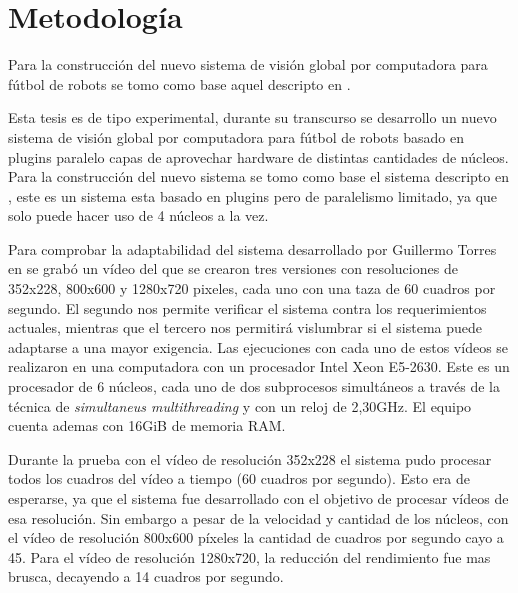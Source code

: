 
\section{Metodología}

Para la construcción del nuevo sistema de visión global por computadora para
fútbol de robots se tomo como base aquel descripto en \cite{torres2014}.

Esta tesis es de tipo experimental, durante su transcurso se desarrollo un
nuevo sistema de visión global por computadora para fútbol de robots basado en
plugins paralelo capas de aprovechar hardware de distintas cantidades de
núcleos. Para la construcción del nuevo sistema se tomo como base el sistema
descripto en \cite{torres2014}, este es un sistema esta basado en plugins pero
de paralelismo limitado, ya que solo puede hacer uso de 4 núcleos a la vez.

Para comprobar la adaptabilidad del sistema desarrollado por Guillermo Torres en
\cite{torres2014} se grabó un vídeo del que se crearon tres versiones con
resoluciones de 352x228, 800x600 y 1280x720 pixeles, cada uno con una taza de 60
cuadros por segundo. El segundo nos permite verificar el sistema contra los
requerimientos actuales, mientras que el tercero nos permitirá vislumbrar si el
sistema puede adaptarse a una mayor exigencia. Las ejecuciones con cada uno de
estos vídeos se realizaron en una computadora con un procesador Intel Xeon
E5-2630. Este es un procesador de 6 núcleos, cada uno de dos subprocesos
simultáneos a través de la técnica de \emph{simultaneus multithreading} y con un
reloj de 2,30GHz. El equipo cuenta ademas con 16GiB de memoria RAM.

Durante la prueba con el vídeo de resolución 352x228 el sistema pudo procesar
todos los cuadros del vídeo a tiempo (60 cuadros por segundo). Esto era de
esperarse, ya que el sistema fue desarrollado con el objetivo de procesar vídeos
de esa resolución. Sin embargo a pesar de la velocidad y cantidad de los
núcleos, con el vídeo de resolución 800x600 píxeles la cantidad de cuadros por
segundo cayo a 45. Para el vídeo de resolución 1280x720, la reducción del
rendimiento fue mas brusca, decayendo a 14 cuadros por segundo.
